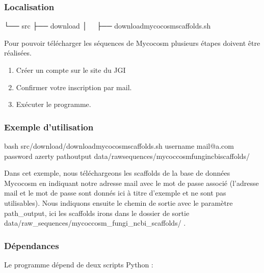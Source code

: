 \documentclass[letterpaper,10pt,french]{sphinxmanual}
\begin{document}
\subsubsection{Localisation}
\label{\detokenize{tutorial:id7}}
\begin{sphinxVerbatim}[commandchars=\\\{\}]
└── src
 ├── download
 │   ├── download\PYGZus{}mycocosm\PYGZus{}scaffolds.sh
\end{sphinxVerbatim}

Pour pouvoir télécharger les séquences de Mycocosm plusieurs étapes doivent être réalisées.
\begin{enumerate}
%
\item {} 
Créer un compte sur le site du JGI  

\item {} 
Confirmer votre inscription par mail.

\item {} 
Exécuter le programme.

\end{enumerate}


\subsubsection{Exemple d’utilisation}
\label{\detokenize{tutorial:id8}}
\begin{sphinxVerbatim}[commandchars=\\\{\}]
bash src/download/download\PYGZus{}mycocosm\PYGZus{}scaffolds.sh 
                  \PYGZhy{}username mail@a.com
                  \PYGZhy{}password azerty 
                  \PYGZhy{}path\PYGZus{}output data/raw\PYGZus{}sequences/mycoccosm\PYGZus{}fungi\PYGZus{}ncbi\PYGZus{}scaffolds/
\end{sphinxVerbatim}

Dans cet exemple, nous téléchargeons les scaffolds de la base de données Mycocosm en indiquant notre adresse mail avec le mot de passe associé (l’adresse mail et le mot de passe sont donnés ici à titre d’exemple et ne sont pas utilisables). Nous indiquons ensuite le chemin de sortie avec le paramètre \sphinxhyphen{}path\_output, ici les scaffolds irons dans le dossier de sortie data/raw\_sequences/mycoccosm\_fungi\_ncbi\_scaffolds/ .


\subsubsection{Dépendances}
\label{\detokenize{tutorial:dependances}}
Le programme dépend de deux scripts Python :
\end{document}
